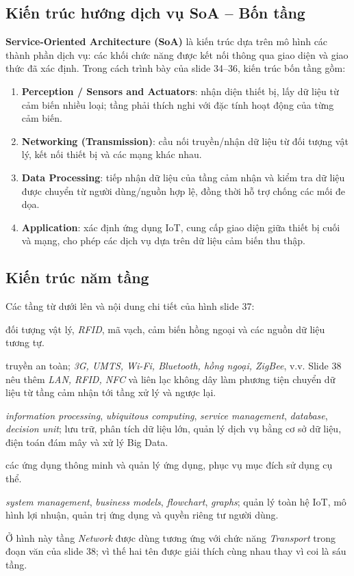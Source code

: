 \subsection{Kiến trúc hướng dịch vụ SoA -- Bốn tầng}
\textbf{Service-Oriented Architecture (SoA)} là kiến trúc dựa trên mô hình các thành phần dịch vụ: các khối chức năng được kết nối thông qua giao diện và giao thức đã xác định. Trong cách trình bày của slide 34--36, kiến trúc bốn tầng gồm:
\begin{enumerate}
\item \textbf{Perception / Sensors and Actuators}: nhận diện thiết bị, lấy dữ liệu từ cảm biến nhiều loại; tầng phải thích nghi với đặc tính hoạt động của từng cảm biến.
\item \textbf{Networking (Transmission)}: cầu nối truyền/nhận dữ liệu từ đối tượng vật lý, kết nối thiết bị và các mạng khác nhau.
\item \textbf{Data Processing}: tiếp nhận dữ liệu của tầng cảm nhận và kiểm tra dữ liệu được chuyển từ người dùng/nguồn hợp lệ, đồng thời hỗ trợ chống các mối đe dọa.
\item \textbf{Application}: xác định ứng dụng IoT, cung cấp giao diện giữa thiết bị cuối và mạng, cho phép các dịch vụ dựa trên dữ liệu cảm biến thu thập.
\end{enumerate}

\subsection{Kiến trúc năm tầng}
Các tầng từ dưới lên và nội dung chi tiết của hình slide 37:
\begin{description}[leftmargin=0pt,labelindent=0pt,style=nextline]
\item[1. Perception -- Cảm nhận:] đối tượng vật lý, \emph{RFID}, mã vạch, cảm biến hồng ngoại và các nguồn dữ liệu tương tự.
\item[2. Network/Transport -- Mạng/truyền tải:] truyền an toàn; \emph{3G, UMTS, Wi-Fi, Bluetooth, hồng ngoại, ZigBee}, v.v. Slide 38 nêu thêm \emph{LAN, RFID, NFC} và liên lạc không dây làm phương tiện chuyển dữ liệu từ tầng cảm nhận tới tầng xử lý và ngược lại.
\item[3. Middleware/Processing -- Trung gian/xử lý:] \emph{information processing}, \emph{ubiquitous computing}, \emph{service management}, \emph{database}, \emph{decision unit}; lưu trữ, phân tích dữ liệu lớn, quản lý dịch vụ bằng cơ sở dữ liệu, điện toán đám mây và xử lý Big Data.
\item[4. Application -- Ứng dụng:] các ứng dụng thông minh và quản lý ứng dụng, phục vụ mục đích sử dụng cụ thể.
\item[5. Business -- Kinh doanh:] \emph{system management}, \emph{business models}, \emph{flowchart}, \emph{graphs}; quản lý toàn hệ IoT, mô hình lợi nhuận, quản trị ứng dụng và quyền riêng tư người dùng.
\end{description}
Ở hình này tầng \emph{Network} được dùng tương ứng với chức năng \emph{Transport} trong đoạn văn của slide 38; vì thế hai tên được giải thích cùng nhau thay vì coi là sáu tầng.

